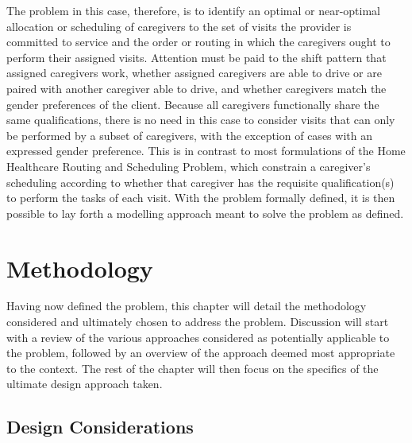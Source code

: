 \documentclass[11pt,twoside]{article}
\numberwithin{Theorem}{section}
\numberwithin{Definition}{section}
\numberwithin{Lemma}{section}
\numberwithin{Algorithm}{section}
\numberwithin{equation}{section}
\begin{document}
The problem in this case, therefore, is to identify an optimal or near-optimal allocation or scheduling of caregivers to the set of visits the provider is committed to service and the order or routing in which the caregivers ought to perform their assigned visits. Attention must be paid to the shift pattern that assigned caregivers work, whether assigned caregivers are able to drive or are paired with another caregiver able to drive, and whether caregivers match the gender preferences of the client. Because all caregivers functionally share the same qualifications, there is no need in this case to consider visits that can only be performed by a subset of caregivers, with the exception of cases with an expressed gender preference. This is in contrast to most formulations of the Home Healthcare Routing and Scheduling Problem, which constrain a caregiver's scheduling according to whether that caregiver has the requisite qualification(s) to perform the tasks of each visit. With the problem formally defined, it is then possible to lay forth a modelling approach meant to solve the problem as defined.

\clearpage

\section{Methodology}
\label{sec:meth}
Having now defined the problem, this chapter will detail the methodology considered and ultimately chosen to address the problem. Discussion will start with a review of the various approaches considered as potentially applicable to the problem, followed by an overview of the approach deemed most appropriate to the context. The rest of the chapter will then focus on the specifics of the ultimate design approach taken.

\subsection{Design Considerations}
\end{document}
